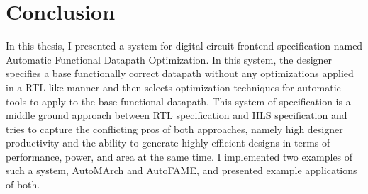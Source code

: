 \section{Conclusion}
In this thesis, I presented a system for digital circuit frontend specification named Automatic Functional Datapath Optimization. In this system, the designer specifies a base functionally correct datapath without any optimizations applied in a RTL like manner and then selects optimization techniques for automatic tools to apply to the base functional datapath. This system of specification is a middle ground approach between RTL specification and HLS specification and tries to capture the conflicting pros of both approaches, namely high designer productivity and the ability to generate highly efficient designs in terms of performance, power, and area at the same time. I implemented two examples of such a system, AutoMArch and AutoFAME, and presented example applications of both.
